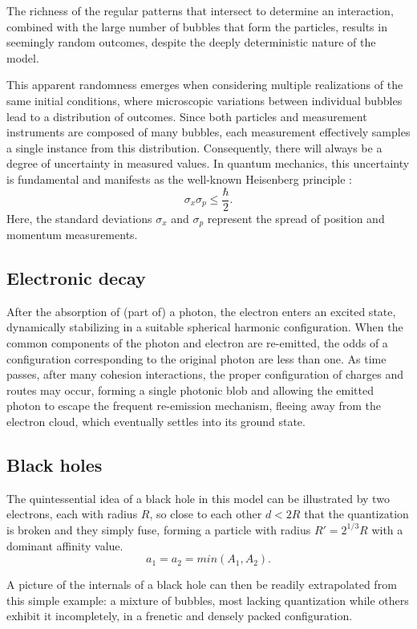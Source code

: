 \documentclass[12pt,english]{article}
\begin{document}
The richness of the regular patterns that intersect to determine an interaction, combined with the large number of bubbles that form the particles, results in seemingly random outcomes, despite the deeply deterministic nature of the model. 

This apparent randomness emerges when considering multiple realizations of the same initial conditions, where microscopic variations between individual bubbles lead to a distribution of outcomes. Since both particles and measurement instruments are composed of many bubbles, each measurement effectively samples a single instance from this distribution. Consequently, there will always be a degree of uncertainty in measured values. In quantum mechanics, this uncertainty is fundamental and manifests as the well-known Heisenberg principle \cite{Heisenberg1927}:
\[
\sigma_x \sigma_p \leq \frac{\hbar}{2}.
\]
Here, the standard deviations $\sigma_x$ and $\sigma_p$ represent the spread of position and momentum measurements.

\subsection{Electronic decay}
After the absorption of (part of) a photon, the electron enters an excited state, dynamically stabilizing in a suitable spherical harmonic configuration. When the common components of the photon and electron are re-emitted, the odds of a configuration corresponding to the original photon are less than one. As time passes, after many cohesion interactions, the proper configuration of charges and routes may occur, forming a single photonic blob and allowing the emitted photon to escape the frequent re-emission mechanism, fleeing away from the electron cloud, which eventually settles into its ground state.

\subsection{Black holes}
The quintessential idea of a black hole in this model can be illustrated by two electrons, each with radius $R$, so close to each other $d<2R$ that the quantization is broken and they simply fuse, forming a particle with radius $R'=2^{1/3}R$ with a dominant affinity value. 
\[
a_1 = a_2 = min(A_1,A_2).
\]

A picture of the internals of a black hole can then be readily extrapolated from this simple example: a mixture of bubbles, most lacking quantization while others exhibit it incompletely, in a frenetic and densely packed configuration.
\end{document}
